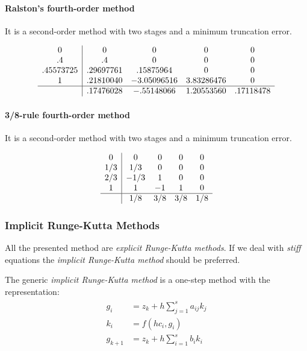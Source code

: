 \paragraph{Ralston's fourth-order method}
It is a second-order method with two stages and a minimum truncation error.

\begin{equation}
	\begin{array}{c|cccc}
		    0     &     0     &      0      &     0      &     0     \\
		   .4     &    .4     &      0      &     0      &     0     \\
		.45573725 & .29697761 &  .15875964  &     0      &     0     \\
		    1     & .21810040 & -3.05096516 & 3.83286476 &     0     \\ \hline
		          & .17476028 & -.55148066  & 1.20553560 & .17118478
	\end{array}
	\label{eq::ralston4}
\end{equation}

\paragraph{3/8-rule fourth-order method}
It is a second-order method with two stages and a minimum truncation error.

\begin{equation}
	\begin{array}{c|cccc}
		 0  &  0   &  0  &  0  &  0  \\
		1/3 & 1/3  &  0  &  0  &  0  \\
		2/3 & -1/3 &  1  &  0  &  0  \\
		 1  &  1   & -1  &  1  &  0  \\ \hline
		    & 1/8  & 3/8 & 3/8 & 1/8
	\end{array}
\end{equation}

\subsubsection{Implicit Runge-Kutta Methods}
All the presented method are \textit{explicit Runge-Kutta methods}. If we deal with \textit{stiff} equations the \textit{implicit Runge-Kutta method} should be preferred.

The generic \textit{implicit Runge-Kutta method} is a one-step method with the representation:
\begin{equation}
	\begin{split}
	\begin{aligned}
		g_i &= z_k + h\sum_{j=1}^{s}a_{ij}k_j \\
		k_i &= f(hc_i,g_i) \\
		g_{k+1} &= z_k + h\sum_{i=1}^{s}b_{i}k_i
		\end{aligned}
	\end{split}
	\label{eq::rungekutta_implicit}
\end{equation}

